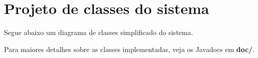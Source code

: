 \section{Projeto de classes do sistema}
    Segue abaixo um diagrama de classes simplificado do sistema. \par
    Para maiores detalhes sobre as classes implementadas, veja os Javadocs em \textbf{doc/}.
